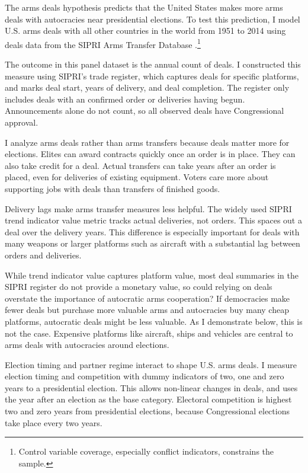 \documentclass[12pt]{article}
\begin{document}
The arms deals hypothesis predicts that the United States makes more arms deals with autocracies near presidential elections.
To test this prediction, I model U.S. arms deals with all other countries in the world from 1951 to 2014 using deals data from the SIPRI Arms Transfer Database \citep{SIPRI2021}.\footnote{Control variable coverage, especially conflict indicators, constrains the sample.}


The outcome in this panel dataset is the annual count of deals.
I constructed this measure using SIPRI's trade register, which captures deals for specific platforms, and marks deal start, years of delivery, and deal completion.
The register only includes deals with an confirmed order or deliveries having begun. 
Announcements alone do not count, so all observed deals have Congressional approval.


I analyze arms deals rather than arms transfers because deals matter more for elections. 
Elites can award contracts quickly once an order is in place.
They can also take credit for a deal. 
Actual transfers can take years after an order is placed, even for deliveries of existing equipment. 
Voters care more about supporting jobs with deals than transfers of finished goods. 


Delivery lags make arms transfer measures less helpful.
The widely used SIPRI trend indicator value metric tracks actual deliveries, not orders.
This spaces out a deal over the delivery years. 
This difference is especially important for deals with many weapons or larger platforms such as aircraft with a substantial lag between orders and deliveries. 


While trend indicator value captures platform value, most deal summaries in the SIPRI register do not provide a monetary value, so could relying on deals overstate the importance of autocratic arms cooperation? 
If democracies make fewer deals but purchase more valuable arms and autocracies buy many cheap platforms, autocratic deals might be less valuable. 
As I demonstrate below, this is not the case. 
Expensive platforms like aircraft, ships and vehicles are central to arms deals with autocracies around elections. 


Election timing and partner regime interact to shape U.S. arms deals. 
I measure election timing and competition with dummy indicators of two, one and zero years to a presidential election. 
This allows non-linear changes in deals, and uses the year after an election as the base category. 
Electoral competition is highest two and zero years from presidential elections, because Congressional elections take place every two years. 
\end{document}

